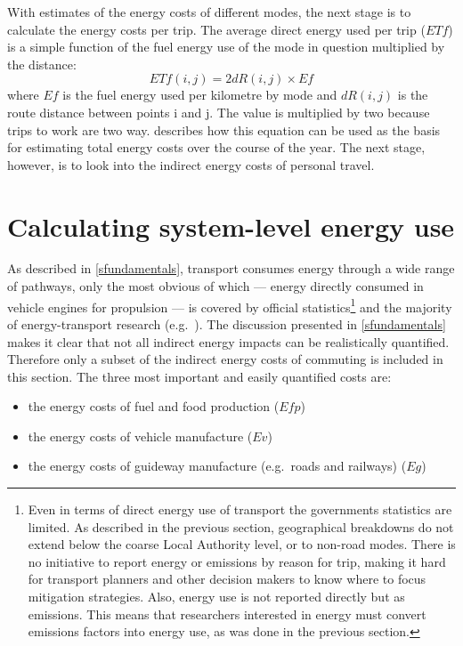 With estimates of the energy costs of different modes, the next stage is to
calculate the energy costs per trip. The average
direct energy used per trip ($ETf$) is a simple function of the fuel
energy use of the mode in question multiplied by the distance:
\begin{equation}
 ETf(i,j) = 2 dR(i,j) \times Ef
\label{eq:et}
\end{equation}
where $Ef$ is the fuel energy used per kilometre by mode and $dR(i,j)$ is
the route distance between points i and j. The value is multiplied by two
because trips to work are two way.  %
describes how this equation can be used as the basis for estimating total
energy costs over the course of the year. The next stage, however, is to
look into the indirect energy costs of personal travel.

\section{Calculating system-level energy use} \label{ssystemlevel}
As described in \cref{sfundamentals}, transport consumes energy through a
wide range of pathways, only the most obvious of which ---
energy directly consumed in vehicle engines for propulsion --- is covered by official
statistics\footnote{Even
in terms of direct energy use of transport the governments statistics are limited.
As described in the previous section, geographical breakdowns do not extend
below the coarse Local Authority level, or to non-road modes. There is no
initiative to report energy or emissions by reason for trip, making it hard
for transport planners and other decision makers to know where to focus
mitigation strategies. Also, energy use is not reported directly but as emissions.
This means that
researchers interested in energy must convert
emissions factors into energy use, as was done in the previous section.
}
and the majority of energy-transport
research (e.g.~\citealp{schipper1992energy, Wohlgemuth1998, Hickman1999, Brand2013}).
The discussion presented in \cref{sfundamentals} makes it clear that not all
indirect energy impacts can be realistically quantified. Therefore only a subset of
the indirect energy costs of commuting is included in this section. The three most
important and easily quantified costs are:
\begin{itemize}
 \item the energy costs of fuel and food production ($Efp$)
 \item the energy costs of vehicle manufacture ($Ev$)
 \item the energy costs of guideway manufacture (e.g.~roads and railways) ($Eg$)
\end{itemize} 

